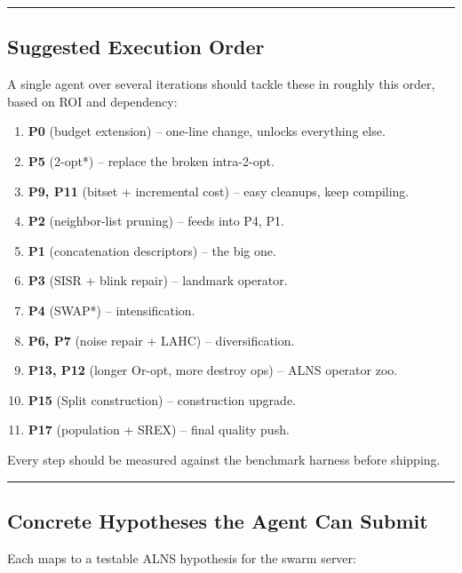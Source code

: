 \documentclass[twocolumn,10pt,letterpaper]{article}
\begin{document}
\vspace{0.5em}
\noindent\rule{\columnwidth}{0.4pt}
\vspace{0.5em}

\subsection{Suggested Execution Order}

A single agent over several iterations should tackle these in roughly this order, based on ROI and dependency:


\begin{enumerate}
\setlength{\itemsep}{0pt}
\setlength{\parskip}{0pt}
  \item \textbf{P0} (budget extension) -- one-line change, unlocks everything else.
  \item \textbf{P5} (2-opt*) -- replace the broken intra-2-opt.
  \item \textbf{P9, P11} (bitset + incremental cost) -- easy cleanups, keep compiling.
  \item \textbf{P2} (neighbor-list pruning) -- feeds into P4, P1.
  \item \textbf{P1} (concatenation descriptors) -- the big one.
  \item \textbf{P3} (SISR + blink repair) -- landmark operator.
  \item \textbf{P4} (SWAP*) -- intensification.
  \item \textbf{P6, P7} (noise repair + LAHC) -- diversification.
  \item \textbf{P13, P12} (longer Or-opt, more destroy ops) -- ALNS operator zoo.
  \item \textbf{P15} (Split construction) -- construction upgrade.
  \item \textbf{P17} (population + SREX) -- final quality push.
\end{enumerate}

Every step should be measured against the benchmark harness before shipping.


\vspace{0.5em}
\noindent\rule{\columnwidth}{0.4pt}
\vspace{0.5em}

\subsection{Concrete Hypotheses the Agent Can Submit}

Each maps to a testable ALNS hypothesis for the swarm server:
\end{document}

